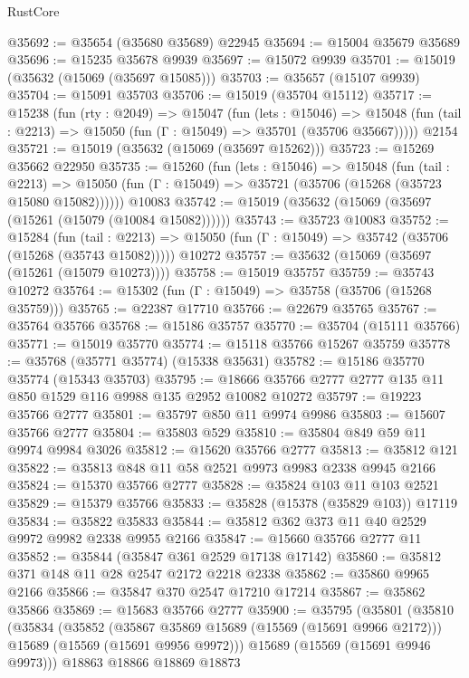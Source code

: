 \begin{lexlean}{RustCore}
\begin{coremodule}
@35692 := @35654 (@35680 @35689) @22945
@35694 := @15004 @35679 @35689
@35696 := @15235 @35678 @9939
@35697 := @15072 @9939
@35701 := @15019 (@35632 (@15069 (@35697 @15085)))
@35703 := @35657 (@15107 @9939)
@35704 := @15091 @35703
@35706 := @15019 (@35704 @15112)
@35717 := @15238
    (fun (rty : @2049) =>
    @15047
      (fun (lets : @15046) =>
      @15048 (fun (tail : @2213) => @15050 (fun (Γ : @15049) => @35701 (@35706 @35667)))))
    @2154
@35721 := @15019 (@35632 (@15069 (@35697 @15262)))
@35723 := @15269 @35662 @22950
@35735 := @15260
    (fun (lets : @15046) =>
    @15048
      (fun (tail : @2213) =>
      @15050 (fun (Γ : @15049) => @35721 (@35706 (@15268 (@35723 @15080 @15082))))))
    @10083
@35742 := @15019 (@35632 (@15069 (@35697 (@15261 (@15079 (@10084 @15082))))))
@35743 := @35723 @10083
@35752 := @15284
    (fun (tail : @2213) => @15050 (fun (Γ : @15049) => @35742 (@35706 (@15268 (@35743 @15082)))))
    @10272
@35757 := @35632 (@15069 (@35697 (@15261 (@15079 @10273))))
@35758 := @15019 @35757
@35759 := @35743 @10272
@35764 := @15302 (fun (Γ : @15049) => @35758 (@35706 (@15268 @35759)))
@35765 := @22387 @17710
@35766 := @22679 @35765
@35767 := @35764 @35766
@35768 := @15186 @35757
@35770 := @35704 (@15111 @35766)
@35771 := @15019 @35770
@35774 := @15118 @35766 @15267 @35759
@35778 := @35768 (@35771 @35774) (@15338 @35631)
@35782 := @15186 @35770 @35774 (@15343 @35703)
@35795 := @18666 @35766 @2777 @2777 @135 @11 @850 @1529 @116 @9988 @135 @2952 @10082 @10272
@35797 := @19223 @35766 @2777
@35801 := @35797 @850 @11 @9974 @9986
@35803 := @15607 @35766 @2777
@35804 := @35803 @529
@35810 := @35804 @849 @59 @11 @9974 @9984 @3026
@35812 := @15620 @35766 @2777
@35813 := @35812 @121
@35822 := @35813 @848 @11 @58 @2521 @9973 @9983 @2338 @9945 @2166
@35824 := @15370 @35766 @2777
@35828 := @35824 @103 @11 @103 @2521
@35829 := @15379 @35766
@35833 := @35828 (@15378 (@35829 @103)) @17119
@35834 := @35822 @35833
@35844 := @35812 @362 @373 @11 @40 @2529 @9972 @9982 @2338 @9955 @2166
@35847 := @15660 @35766 @2777 @11
@35852 := @35844 (@35847 @361 @2529 @17138 @17142)
@35860 := @35812 @371 @148 @11 @28 @2547 @2172 @2218 @2338
@35862 := @35860 @9965 @2166
@35866 := @35847 @370 @2547 @17210 @17214
@35867 := @35862 @35866
@35869 := @15683 @35766 @2777
@35900 := @35795
    (@35801
      (@35810
        (@35834
          (@35852
            (@35867 @35869 @15689 (@15569 (@15691 @9966 @2172)))
            @15689
            (@15569 (@15691 @9956 @9972)))
          @15689
          (@15569 (@15691 @9946 @9973)))
        @18863
        @18866
        @18869
        @18873

\end{coremodule}
\end{lexlean}
